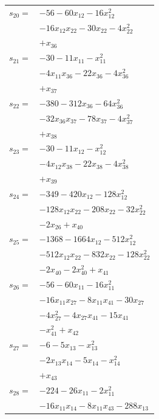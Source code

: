 \begin{longtable}{@{}r@{\;}l@{}}
\(s_{20}=\) & \(\displaystyle -56 -60x_{12} -16x_{12}^{2}\) \\
 & \(\displaystyle -16x_{12}x_{22} -30x_{22} -4x_{22}^{2}\) \\
 & \(\displaystyle +x_{36}\) \\[3pt]
\(s_{21}=\) & \(\displaystyle -30 -11x_{11} -x_{11}^{2}\) \\
 & \(\displaystyle -4x_{11}x_{36} -22x_{36} -4x_{36}^{2}\) \\
 & \(\displaystyle +x_{37}\) \\[3pt]
\(s_{22}=\) & \(\displaystyle -380 -312x_{36} -64x_{36}^{2}\) \\
 & \(\displaystyle -32x_{36}x_{37} -78x_{37} -4x_{37}^{2}\) \\
 & \(\displaystyle +x_{38}\) \\[3pt]
\(s_{23}=\) & \(\displaystyle -30 -11x_{12} -x_{12}^{2}\) \\
 & \(\displaystyle -4x_{12}x_{38} -22x_{38} -4x_{38}^{2}\) \\
 & \(\displaystyle +x_{39}\) \\[3pt]
\(s_{24}=\) & \(\displaystyle -349 -420x_{12} -128x_{12}^{2}\) \\
 & \(\displaystyle -128x_{12}x_{22} -208x_{22} -32x_{22}^{2}\) \\
 & \(\displaystyle -2x_{26} +x_{40}\) \\[3pt]
\(s_{25}=\) & \(\displaystyle -1368 -1664x_{12} -512x_{12}^{2}\) \\
 & \(\displaystyle -512x_{12}x_{22} -832x_{22} -128x_{22}^{2}\) \\
 & \(\displaystyle -2x_{40} -2x_{40}^{2} +x_{41}\) \\[3pt]
\(s_{26}=\) & \(\displaystyle -56 -60x_{11} -16x_{11}^{2}\) \\
 & \(\displaystyle -16x_{11}x_{27} -8x_{11}x_{41} -30x_{27}\) \\
 & \(\displaystyle -4x_{27}^{2} -4x_{27}x_{41} -15x_{41}\) \\
 & \(\displaystyle -x_{41}^{2} +x_{42}\) \\[3pt]
\(s_{27}=\) & \(\displaystyle -6 -5x_{13} -x_{13}^{2}\) \\
 & \(\displaystyle -2x_{13}x_{14} -5x_{14} -x_{14}^{2}\) \\
 & \(\displaystyle +x_{43}\) \\[3pt]
\(s_{28}=\) & \(\displaystyle -224 -26x_{11} -2x_{11}^{2}\) \\
 & \(\displaystyle -16x_{11}x_{14} -8x_{11}x_{43} -288x_{13}\) \\

\end{longtable}
